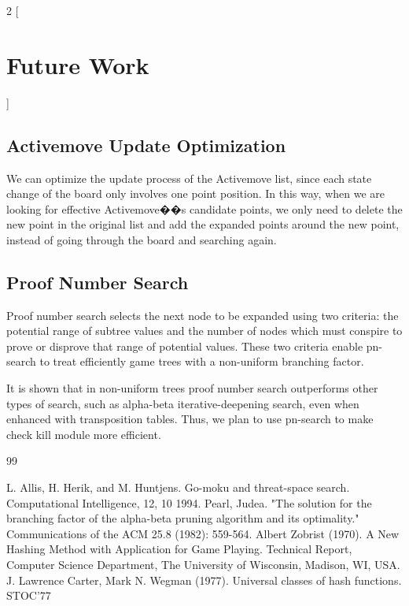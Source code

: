 \documentclass[a4paper, 12pt]{article} %
\begin{document}
\begin{multicols}{2}
  [
      \section{Future Work}
  ]
  \subsection{Activemove Update Optimization}
  We can optimize the update process of the Activemove list, since each state change of the board only involves one point position. In this way, when we are looking for effective Activemove��s candidate points, we only need to delete the new point in the original list and add the expanded points around the new point, instead of going through the board and searching again.
  
  \subsection{Proof Number Search}
  Proof number search selects the next node to be expanded using two criteria: the potential range of subtree values and the number of nodes which must conspire to prove or disprove that range of potential values. These two criteria enable pn-search to treat efficiently game trees with a non-uniform branching factor.
  
  It is shown that in non-uniform trees proof number search outperforms other types of search, such as alpha-beta iterative-deepening search, even when enhanced with transposition tables. Thus, we plan to use pn-search to make check kill module more efficient.
  
\end{multicols}

\begin{thebibliography}{99}  

  	L. Allis, H. Herik, and M. Huntjens. Go-moku and
	threat-space search. Computational Intelligence, 12, 10 1994.
  	Pearl, Judea. "The solution for the branching factor of the alpha-beta pruning algorithm and its optimality." Communications of the ACM 25.8 (1982): 559-564.
 	Albert Zobrist (1970). A New Hashing Method with Application for Game Playing. Technical Report, Computer Science Department, The University of Wisconsin, Madison, WI, USA.
  	J. Lawrence Carter, Mark N. Wegman (1977). Universal classes of hash functions. STOC'77

\end{thebibliography}


\bigskip


\end{document}
